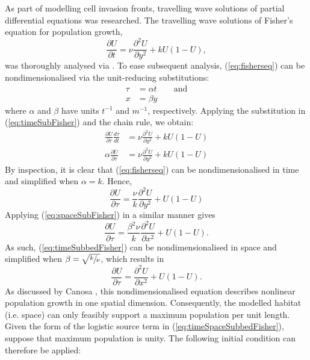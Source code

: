 \documentclass[11pt,a4paper]{article}
\begin{document}
		As part of modelling cell invasion fronts, travelling wave solutions of partial differential equations was researched. The travelling wave solutions of Fisher's equation for population growth,
		\begin{equation}
			 \label{eq:fisherseq}
			 \frac{\partial U}{\partial t} = \nu \frac{\partial^2 U}{\partial y^2} + k U (1 - U),
		\end{equation}
		was thoroughly analysed via \cite{canosa1973nonlinear}. To ease subsequent analysis, (\ref{eq:fisherseq}) can be nondimensionalised via the unit-reducing substitutions:
		\begin{align}
			 \label{eq:timeSubFisher}
			 \tau &= \alpha t \qquad \text{and} \\
			 \label{eq:spaceSubFisher} 
			 x &= \beta y
		\end{align}
		where $\alpha$ and $\beta$ have units $t^{-1}$ and $m^{-1}$, respectively. Applying the substitution in (\ref{eq:timeSubFisher}) and the chain rule, we obtain:
		\begin{align*}
			 \frac{\partial U}{\partial \tau} \frac{d \tau}{d t} &= \nu \frac{\partial^2 U}{\partial y^2} + k U (1 - U) \\ 
			 \alpha \frac{\partial U}{\partial \tau} &= \nu \frac{\partial^2 U}{\partial y^2} + k U (1 - U)
		\end{align*}
		By inspection, it is clear that (\ref{eq:fisherseq}) can be nondimensionalised in time and simplified when $\alpha = k$. Hence,
		\begin{equation}
			 \label{eq:timeSubbedFisher}
			 \frac{\partial U}{\partial \tau} = \frac{\nu}{k} \frac{\partial^2 U}{\partial y^2} + U (1 - U)
		\end{equation}
		Applying (\ref{eq:spaceSubFisher}) in a similar manner gives
		\begin{equation*}
			 \frac{\partial U}{\partial \tau} = \frac{\beta^2 \nu}{k} \frac{\partial^2 U}{\partial x^2} + U (1 - U).
		\end{equation*}
		As such, (\ref{eq:timeSubbedFisher}) can be nondimensionalised in space and simplified when $\beta = \sqrt{\sfrac{k}{\nu}}$, which results in
		\begin{equation}
			 \label{eq:timeSpaceSubbedFisher}
			 \frac{\partial U}{\partial \tau} = \frac{\partial^2 U}{\partial x^2} + U (1 - U).
		\end{equation}
		As discussed by Canosa \cite{canosa1973nonlinear}, this nondimensionalised equation describes nonlinear population growth in one spatial dimension. Consequently, the modelled habitat (i.e. space) can only feasibly support a maximum population per unit length. Given the form of the logistic source term in (\ref{eq:timeSpaceSubbedFisher}), suppose that maximum population is unity. The following initial condition can therefore be applied:
\end{document}
